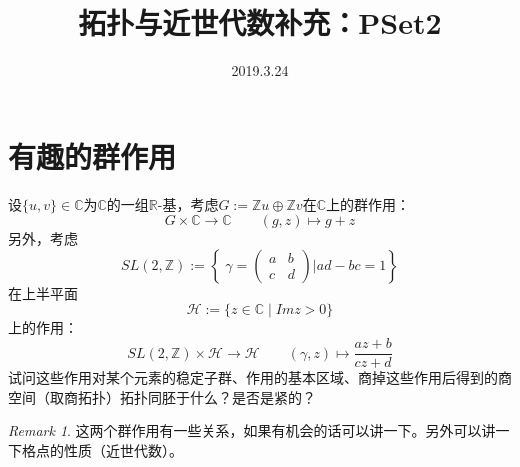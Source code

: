 \documentclass{ctexart}
\numberwithin{equation}{section}
\theoremstyle{plain}
\theoremstyle{plain}
\numberwithin{equation}{section}
\theoremstyle{remark}
\newtheorem{remark}[theorem]{Remark}
\begin{document}
\date{}

\title
{拓扑与近世代数补充：PSet2}


\author{2019.3.24}
\maketitle








\section{有趣的群作用}
设$\{u,v\} \in \mathbb{C}$为$\mathbb{C}$的一组$\mathbb{R}$-基，考虑$G:=\mathbb{Z}u \oplus \mathbb{Z}v$在$\mathbb{C}$上的群作用：
$$G \times \mathbb{C} \longrightarrow \mathbb{C} \qquad (g,z) \longmapsto g+z$$
另外，考虑
$$SL(2,\mathbb{Z}):=\left\{\;\gamma=\begin{pmatrix}
a & b\\
c & d
\end{pmatrix}\Bigg|ad-bc=1\right\}$$
在上半平面
$$\mathcal{H}:=\{z \in \mathbb{C} \mid Im z>0\}$$
上的作用：
$$SL(2,\mathbb{Z}) \times \mathcal{H}\longrightarrow \mathcal{H} \qquad (\gamma,z) \longmapsto \frac{az+b}{cz+d}$$
试问这些作用对某个元素的稳定子群、作用的基本区域、商掉这些作用后得到的商空间（取商拓扑）拓扑同胚于什么？是否是紧的？
\begin{remark}
	这两个群作用有一些关系，如果有机会的话可以讲一下。另外可以讲一下格点的性质（近世代数）。
\end{remark}
\end{document}
